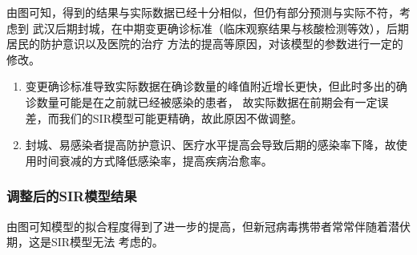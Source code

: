 \documentclass{article}
\begin{document}
由图可知，得到的结果与实际数据已经十分相似，但仍有部分预测与实际不符，考虑到
武汉后期封城，在中期变更确诊标准（临床观察结果与核酸检测等效），后期居民的防护意识以及医院的治疗
方法的提高等原因，对该模型的参数进行一定的修改。

\begin{enumerate}
    \item 变更确诊标准导致实际数据在确诊数量的峰值附近增长更快，但此时多出的确诊数量可能是在之前就已经被感染的患者，
    故实际数据在前期会有一定误差，而我们的SIR模型可能更精确，故此原因不做调整。
    \item 封城、易感染者提高防护意识、医疗水平提高会导致后期的感染率下降，故使用时间衰减的方式降低感染率，提高疾病治愈率。
\end{enumerate}
\clearpage
\subsubsection*{调整后的SIR模型结果}
\begin{figure}[h!]
    \centering
        
\end{figure}

由图可知模型的拟合程度得到了进一步的提高，但新冠病毒携带者常常伴随着潜伏期，这是SIR模型无法
考虑的。
\end{document}
